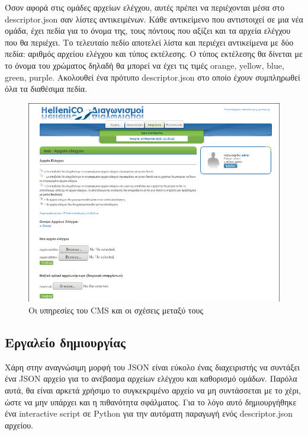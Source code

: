 \documentclass[diploma]{softlab-thesis}
\begin{document}
\bigskip

Όσον αφορά στις ομάδες αρχείων ελέγχου, αυτές πρέπει να περιέχονται μέσα στο
descriptor.json σαν λίστες αντικειμένων. Κάθε αντικείμενο που αντιστοιχεί σε
μια νέα ομάδα, έχει πεδία για το όνομα της, τους πόντους που αξίζει και τα
αρχεία ελέγχου που θα περιέχει. Το τελευταίο πεδίο αποτελεί λίστα και περιέχει
αντικείμενα με δύο πεδία: αριθμός αρχείου ελέγχου και τύπος εκτέλεσης. Ο τύπος
εκτέλεσης θα δίνεται με το όνομα του χρώματος δηλαδή θα μπορεί να έχει τις
τιμές orange, yellow, blue, green, purple. Ακολουθεί ένα πρότυπο
descriptor.json στο οποίο έχουν συμπληρωθεί όλα τα διαθέσιμα πεδία.



\begin{figure}
  \centering
  \includegraphics[scale=0.4,trim=4 4 4 4,clip]{Figures/massupload.png}
  \caption[Η αρχιτεκτονική του CMS]{Οι υπηρεσίες του CMS και οι σχέσεις μεταξύ τους}
\end{figure}

\subsection{Εργαλείο δημιουργίας}

Χάρη στην αναγνώσιμη μορφή του JSON είναι εύκολο ένας διαχειριστής να συντάξει
ένα JSON αρχείο για το ανέβασμα αρχείων ελέγχου και καθορισμό ομάδων. Παρόλα
αυτά, θα είναι αρκετά χρήσιμο το συγκεκριμένο αρχείο να μη συντάσσεται με το
χέρι, ώστε να μην υπάρχει και η πιθανότητα σφάλματος. Για το λόγο αυτό
δημιουργήθηκε ένα interactive script σε Python για την αυτόματη παραγωγή ενός
descriptor.json αρχείου.
\end{document}
